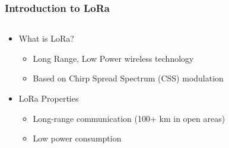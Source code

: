 \documentclass[aspectratio=169]{beamer}
\begin{document}
\begin{frame}[t]
  \frametitle{Introduction to LoRa}
  \begin{columns}
    \begin{column}{0.66\textwidth}
      \begin{itemize}
        \item What is LoRa?
        \medskip
        \begin{itemize}
          \item Long Range, Low Power wireless technology
          \medskip
          \item Based on Chirp Spread Spectrum (CSS) modulation
        \end{itemize}
        \medskip
        \item LoRa Properties
        \medskip
        \begin{itemize}
          \item Long-range communication (100+ km in open areas)
          \medskip
          \item Low power consumption
        \end{itemize}
      \end{itemize}
    \end{column}
    \begin{column}{0.33\textwidth}
    \end{column}
  \end{columns}
\end{frame}
\end{document}
